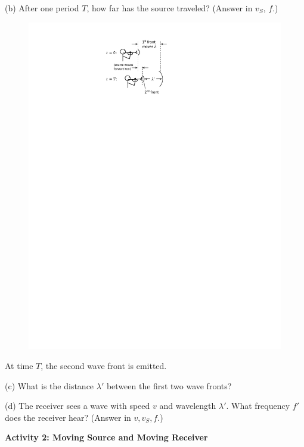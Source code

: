 (b) After one period $T$, how far has the source traveled? (Answer in $v_S$, $f$.)

\begin{figure}
\vspace{-1.5in}
\includegraphics{doppler_shift/front_motion.pdf}
\end{figure}

\vspace{1.0in}


At time $T$, the second wave front is emitted.

(c) What is the distance $\lambda'$ between the first two wave fronts?
\vspace{1.0in}

(d) The receiver sees a wave with speed $v$ and wavelength $\lambda'$.  What frequency $f'$ does the receiver hear? (Answer in $v, v_S, f$.)
\vspace{1.0in}

\pagebreak
\textbf{Activity 2: Moving Source and Moving Receiver}

